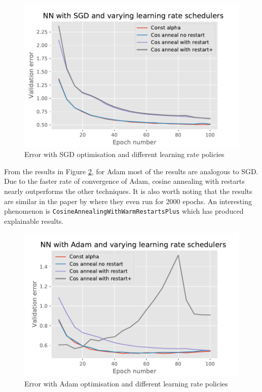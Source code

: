 \documentclass{article}
\begin{document}
\begin{figure}[tb]
\vskip 5mm
\begin{center}
\centerline{\includegraphics[width=\columnwidth]{ex3_sgd_comparison.pdf}}
\caption{Error with SGD optimisation and different learning rate policies}
\label{fig:ex3_sgd}
\end{center}
\vskip -5mm
\end{figure}

From the results in Figure \ref{fig:ex3_adam}, for Adam most of the results are analogous to SGD. Due to the faster rate of convergence of Adam, cosine annealing with restarts nearly outperforms the other techniques. It is also worth noting that the results are similar in the paper by \citeauthor{loshchilov2018fixing} where they even run for 2000 epochs. An interesting phenomenon is \texttt{CosineAnnealingWithWarmRestartsPlus} which has produced explainable results.

\begin{figure}[tb]
\vskip 5mm
\begin{center}
\centerline{\includegraphics[width=\columnwidth]{ex3_adam_comparison.pdf}}
\caption{Error with Adam optimisation and different learning rate policies}
\label{fig:ex3_adam}
\end{center}
\vskip -5mm
\end{figure}
\end{document}
